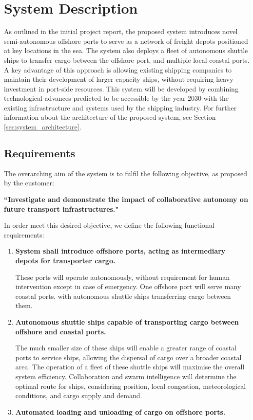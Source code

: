 \section{System Description}

As outlined in the initial project report, the proposed system introduces novel semi-autonomous offshore ports to serve as a network of freight depots positioned at key locations in the sea. The system also deploys a fleet of autonomous shuttle ships to transfer cargo between the offshore port, and multiple local coastal ports. A key advantage of this approach is allowing existing shipping companies to maintain their development of larger capacity ships, without requiring heavy investment in port-side resources. This system will be developed by combining technological advances predicted to be accessible by the year 2030 with the existing infrastructure and systems used by the shipping industry. For further information about the architecture of the proposed system, see Section \ref{sec:system_architecture}.

\subsection{Requirements}

\noindent The overarching aim of the system is to fulfil the following objective, as proposed by the customer:

\noindent\textbf{``Investigate and demonstrate the impact of collaborative autonomy on future transport infrastructures."}

\noindent In order meet this desired objective, we define the following functional requirements:

\begin{enumerate}[label={\textbf{(\arabic*)}}, itemsep=1pt, topsep=1pt]
	\item \textbf{System shall introduce offshore ports, acting as intermediary depots for transporter cargo.}

		These ports will operate autonomously, without requirement for human intervention except in case of emergency. One offshore port will serve many coastal ports, with autonomous shuttle ships transferring cargo between them. 

	\item \textbf{Autonomous shuttle ships capable of transporting cargo between offshore and coastal ports.}

		The much smaller size of these ships will enable a greater range of coastal ports to service ships, allowing the dispersal of cargo over a broader coastal area. The operation of a fleet of these shuttle ships will maximise the overall system efficiency. Collaboration and swarm intelligence will determine the optimal route for ships, considering position, local congestion, meteorological conditions, and cargo supply and demand.

	\item \textbf{Automated loading and unloading of cargo on offshore ports.}
\end{enumerate}

